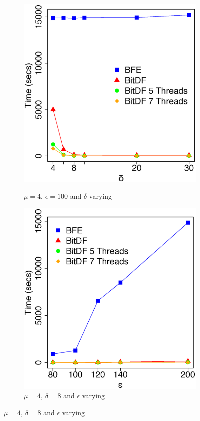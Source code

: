 {\begin{figure}[h!]
    \centering
    \caption{Results varying $\delta$ and $\epsilon$ for Brinkhoff dataset}
    \begin{subfigure}[t]{0.49\textwidth}
        \caption{$\mu = 4$, $\epsilon = 100$ and $\delta$ varying}
        \includegraphics[width=\textwidth]{images/Brinkhoff_complete_varying_l.eps}
        \label{fig:brinkhoff_complete_vary_l}
    \end{subfigure}
    \begin{subfigure}[t]{0.49\textwidth}
        \caption{$\mu = 4$, $\delta = 8$ and $\epsilon$ varying}
        \includegraphics[width=\textwidth]{images/Brinkhoff_complete_varying_g.eps}

\end{subfigure}
\end{figure}}
